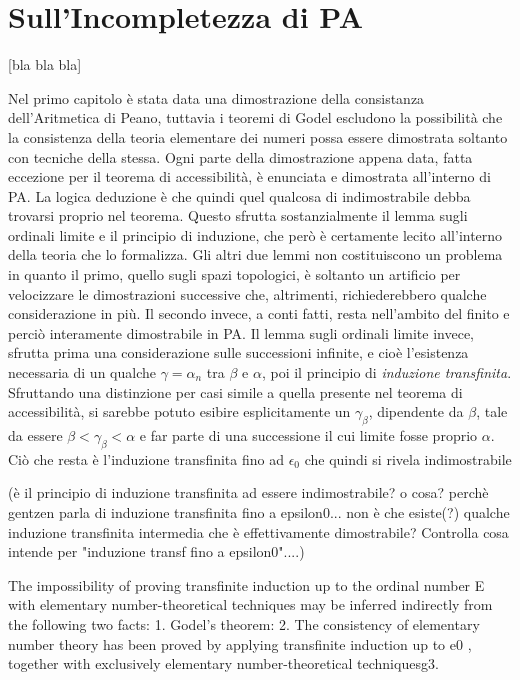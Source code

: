 \chapter{Sull'Incompletezza di PA}
		[bla bla bla]
		
		Nel primo capitolo è stata data una dimostrazione della consistanza dell'Aritmetica di Peano, tuttavia i teoremi di Godel escludono la possibilità che la consistenza della teoria elementare dei numeri possa essere dimostrata soltanto con tecniche della stessa.
		Ogni parte della dimostrazione appena data, fatta eccezione per il teorema di accessibilità, è enunciata e dimostrata all'interno di PA. La logica deduzione è che quindi quel qualcosa di indimostrabile debba trovarsi proprio nel teorema. Questo sfrutta sostanzialmente il lemma sugli ordinali limite e il principio di induzione, che però è certamente lecito all'interno della teoria che lo formalizza.
		Gli altri due lemmi non costituiscono un problema in quanto il primo, quello sugli spazi topologici, è soltanto un artificio per velocizzare le dimostrazioni successive che, altrimenti, richiederebbero qualche considerazione in più. Il secondo invece, a conti fatti, resta nell'ambito del finito e perciò interamente dimostrabile in PA.
		Il lemma sugli ordinali limite invece, sfrutta prima una considerazione sulle successioni infinite, e cioè l'esistenza necessaria di un qualche $\gamma = \alpha_{n}$ tra $\beta$ e $\alpha$, poi il principio di \emph{induzione transfinita}. Sfruttando una distinzione per casi simile a quella presente nel teorema di accessibilità, si sarebbe potuto esibire esplicitamente un $\gamma_{\beta}$, dipendente da $\beta$, tale da essere $\beta < \gamma_{\beta} < \alpha$ e far parte di una successione il cui limite fosse proprio $\alpha$.
		Ciò che resta è l'induzione transfinita fino ad $\epsilon_{0}$ che quindi si rivela indimostrabile 
		
		(è il principio di induzione transfinita ad essere indimostrabile? o cosa? perchè gentzen parla di induzione transfinita fino a epsilon0... non è che esiste(?) qualche induzione transfinita intermedia che è effettivamente dimostrabile? Controlla cosa intende per "induzione transf fino a epsilon0"....)
		
		
		The impossibility of proving transfinite induction up to the ordinal 
		number E~ with elementary number-theoretical techniques may be inferred 
		indirectly from the following two facts: 
		1. Godel’s theorem:
		2. The consistency of elementary number theory has been proved by 
		applying transfinite induction up to e0 , together with exclusively elementary 
		number-theoretical techniquesg3.
		
